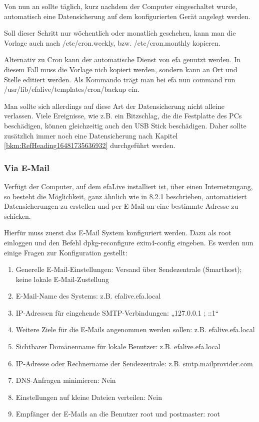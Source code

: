 \documentclass[a4paper,12pt,twoside]{article}
\begin{document}
Von nun an sollte täglich, kurz nachdem der Computer eingeschaltet
wurde, automatisch eine Datensicherung auf dem konfigurierten Gerät
angelegt werden.

Soll dieser Schritt nur wöchentlich oder monatlich geschehen, kann man
die Vorlage auch nach /etc/cron.weekly, bzw. /etc/cron.monthly
kopieren.


\bigskip

Alternativ zu Cron kann der automatische Dienst von efa genutzt werden.
In diesem Fall muss die Vorlage nich kopiert werden, sondern kann an
Ort und Stelle editiert werden. Als Kommando trägt man bei efa nun
{\textquotedbl}command run
/usr/lib/efalive/templates/cron/backup{\textquotedbl} ein.


\bigskip

Man sollte sich allerdings auf diese Art der Datensicherung nicht
alleine verlassen. Viele Ereignisse, wie z.B. ein Bitzschlag, die die
Festplatte des PCs beschädigen, können gleichzeitig auch den USB Stick
beschädigen. Daher sollte zusätzlich immer noch eine Datensicherung
nach Kapitel \ref{bkm:RefHeading16481735636932} durchgeführt werden.


\bigskip

\subsubsection[Via E{}-Mail]{Via E-Mail}
Verfügt der Computer, auf dem efaLive installiert ist, über einen
Internetzugang, so besteht die Möglichkeit, ganz ähnlich wie in 8.2.1
beschrieben, automatisiert Datensicherungen zu erstellen und per E-Mail
an eine bestimmte Adresse zu schicken. 

Hierfür muss zuerst das E-Mail System konfiguriert werden. Dazu als
{\textquotedbl}root{\textquotedbl} einloggen und den Befehl
{\textquotedbl}dpkg-reconfigure exim4-config{\textquotedbl} eingeben.
Es werden nun einige Fragen zur Konfiguration gestellt:


\bigskip

\begin{enumerate}
\item Generelle E-Mail-Einstellungen: \newline
Versand über Sendezentrale (Smarthost); keine lokale E-Mail-Zustellung
\item E-Mail-Name des Systems: z.B. efalive.efa.local
\item IP-Adressen für eingehende SMTP-Verbindungen: „127.0.0.1 ; ::1“
\item Weitere Ziele für die E-Mails angenommen werden sollen: z.B.
efalive.efa.local
\item Sichtbarer Domänenname für lokale Benutzer: z.B. efalive.efa.local
\item IP-Adresse oder Rechnername der Sendezentrale: z.B.
smtp.mailprovider.com
\item DNS-Anfragen minimieren: Nein
\item Einstellungen auf kleine Dateien verteilen: Nein
\item Empfänger der E-Mails an die Benutzer root und postmaster: root
\end{enumerate}
\end{document}
